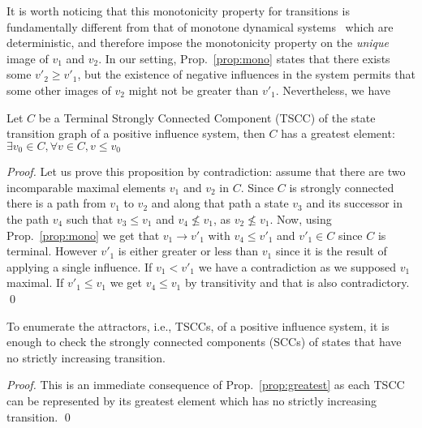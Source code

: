 \documentclass{llncs}
\newcommand{\lra}{\longrightarrow}
\begin{document}
It is worth noticing that this monotonicity property for transitions is fundamentally different from that of
monotone dynamical systems~\cite{AS03tac} which are deterministic, and therefore impose the monotonicity property on
the \emph{unique} image of $v_1$ and $v_2$.
In our setting, Prop.~\ref{prop:mono} states that there exists some $v'_2\geq v'_1$, but
the existence of negative influences in the system permits that some other images of $v_2$ might not
be greater than $v'_1$. Nevertheless, we have

\begin{proposition}
   \label{prop:greatest}
   Let $C$ be a Terminal Strongly Connected Component (TSCC) of the state transition
   graph of a positive influence system, then $C$ has a greatest element:
$\exists v_0\in C, \forall v\in C, v\leq v_0$

\end{proposition}

\begin{proof}

   Let us prove this proposition by contradiction: assume that there are two
   incomparable maximal elements $v_1$ and $v_2$ in $C$. Since $C$ is strongly
   connected there is a path from $v_1$ to $v_2$ and along that path a state
   $v_3$ and its successor in the path $v_4$ such that $v_3\leq v_1$ and
   $v_4\not\leq v_1$, as $v_2\not\leq v_1$. Now, using Prop.~\ref{prop:mono}
   we get that $v_1\lra v'_1$ with $v_4\leq v'_1$ and $v'_1\in C$ since
   $C$ is terminal. However $v'_1$ is either greater or less than $v_1$ since
   it is the result of applying a single influence. If $v_1 < v'_1$ we have
   a contradiction as we supposed $v_1$ maximal. If $v'_1\leq v_1$ we get
   $v_4\leq v_1$ by transitivity and that is also contradictory. \qed

\end{proof}

\begin{corollary}

   To enumerate the attractors, i.e., TSCCs, of a positive influence system,
   it is enough to check the strongly connected components (SCCs) of states
   that have no strictly increasing transition.

\end{corollary}

\begin{proof}

   This is an immediate consequence of Prop.~\ref{prop:greatest} as each TSCC
   can be represented by its greatest element which has no strictly
   increasing transition. \qed

\end{proof}
\end{document}
